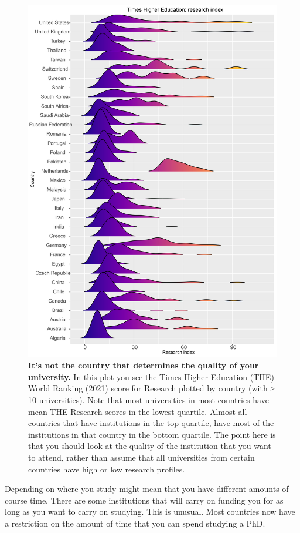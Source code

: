 \documentclass[
]{krantz}
\begin{document}
\begin{figure}
\includegraphics[width=0.95\linewidth]{figures/THEreseasrchcountry} \caption{\textbf{It's not the country that determines the quality of your university.} In this plot you see the Times Higher Education (THE) World Ranking (2021) score for Research plotted by country (with ≥ 10 universities). Note that most universities in most countries have mean THE Research scores in the lowest quartile. Almost all countries that have institutions in the top quartile, have most of the institutions in that country in the bottom quartile. The point here is that you should look at the quality of the institution that you want to attend, rather than assume that all universities from certain countries have high or low research profiles.}\label{fig:THEreseasrchcountry}
\end{figure}

Depending on where you study might mean that you have different amounts of course time. There are some institutions that will carry on funding you for as long as you want to carry on studying. This is unusual. Most countries now have a restriction on the amount of time that you can spend studying a PhD.
\end{document}

